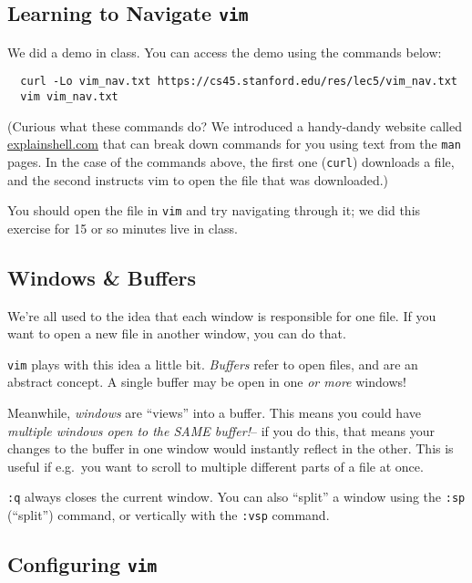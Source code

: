 \subsection{Learning to Navigate {\tt vim}}

\begin{example}[codeblock]
  We did a demo in class. You can access the demo using the commands below:
  \begin{verbatim}
  curl -Lo vim_nav.txt https://cs45.stanford.edu/res/lec5/vim_nav.txt
  vim vim_nav.txt
  \end{verbatim}
\end{example}

(Curious what these commands do? We introduced a handy-dandy website called
\href{https://explainshell.com/explain?cmd=curl+-Lo+vim_nav.txt+https%3A%2F%2Fcs45.stanford.edu%2Fres%2Flec5%2Fvim_nav.txt#}{explainshell.com}
that can break down commands for you using text from the {\tt man} pages. In the
case of the commands above, the first one ({\tt curl}) downloads a file, and the second
instructs vim to open the file that was downloaded.)

You should open the file in {\tt vim} and try navigating through it; we did
this exercise for 15 or so minutes live in class.

\subsection{Windows \& Buffers}

We're all used to the idea that each window is responsible for one file. If you want
to open a new file in another window, you can do that.

{\tt vim} plays with this idea a little bit. {\em Buffers} refer to open files,
and are an abstract concept. A single buffer may be open in one {\em or more} windows!

Meanwhile, {\em windows} are ``views'' into a buffer. This means you could have
{\em multiple windows open to the SAME buffer!}-- if you do this, that means your changes
to the buffer in one window would instantly reflect in the other. This is useful if e.g.\ 
you want to scroll to multiple different parts of a file at once.

{\tt :q} always closes the current window. You can also ``split'' a window using the
{\tt :sp} (``split'') command, or vertically with the {\tt :vsp} command.

\subsection{Configuring {\tt vim}}

